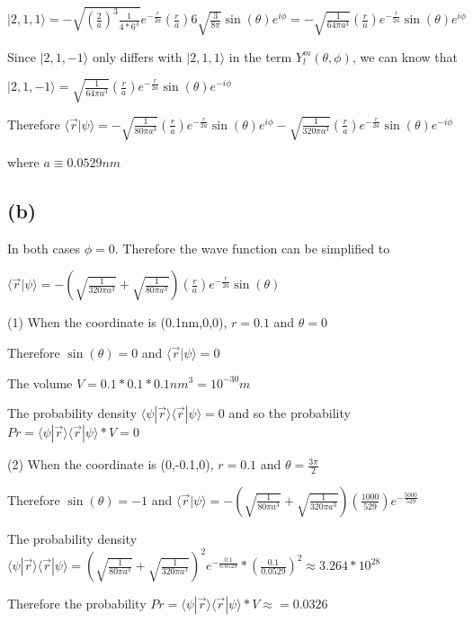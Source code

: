 \documentclass[12pt]{article}
\begin{document}
\begin{spacing}{2.0}
$|2,1,1\rangle=-\sqrt{\left(\frac{2}{a}\right)^{3}\frac{1}{4*6^3}}e^{-\frac{r}{2a}}\left(\frac{r}{a}\right)
6\sqrt{\frac{3}{8\pi}}\sin(\theta)e^{i\phi}
=-\sqrt{\frac{1}{64\pi a^3}}\left(\frac{r}{a}\right)e^{-\frac{r}{2a}}\sin(\theta)e^{i\phi}$

Since $|2,1,-1\rangle$ only differs with $|2,1,1\rangle$ in the term $Y_l^m(\theta,\phi)$, we can know that

$|2,1,-1\rangle=\sqrt{\frac{1}{64\pi a^3}}\left(\frac{r}{a}\right)e^{-\frac{r}{2a}}\sin(\theta)e^{-i\phi}$

Therefore $\langle\vec{r}|\psi\rangle= -\sqrt{\frac{1}{80\pi a^3}}\left(\frac{r}{a}\right)e^{-\frac{r}{2a}}\sin(\theta)e^{i\phi} -\sqrt{\frac{1}{320\pi a^3}}\left(\frac{r}{a}\right)e^{-\frac{r}{2a}}\sin(\theta)e^{-i\phi}$

where $a\equiv 0.0529 nm$

\subsection*{(b)}
In both cases $\phi=0$. Therefore the wave function can be simplified to

$\langle\vec{r}|\psi\rangle= -\left(\sqrt{\frac{1}{320\pi a^3}}+\sqrt{\frac{1}{80\pi a^3}}\right) \left(\frac{r}{a}\right)e^{-\frac{r}{2a}}\sin(\theta) $

(1) When the coordinate is (0.1nm,0,0), $r=0.1$ and $\theta=0$

Therefore $\sin(\theta)=0$ and $\langle\vec{r}|\psi\rangle=0$

The volume $V=0.1*0.1*0.1 nm^3=10^{-30}m$

The probability density $\langle\psi|\vec{r}\rangle \langle\vec{r}|\psi\rangle=0$ and so the probability $Pr=\langle\psi|\vec{r}\rangle \langle\vec{r}|\psi\rangle*V=0$

(2) When the coordinate is (0,-0.1,0), $r=0.1$ and $\theta=\frac{3\pi}{2}$

Therefore $\sin(\theta)=-1$ and $\langle\vec{r}|\psi\rangle= -\left(\sqrt{\frac{1}{80\pi a^3}} +\sqrt{\frac{1}{320\pi a^3}} \right) \left(\frac{1000}{529}\right)e^{-\frac{5000}{529}}$

The probability density $\langle\psi|\vec{r}\rangle \langle\vec{r}|\psi\rangle= \left(\sqrt{\frac{1}{80\pi a^3}} +\sqrt{\frac{1}{320\pi a^3}} \right)^2 e^{-\frac{0.1}{0.0529}}*(\frac{0.1}{0.0529})^2 \approx 3.264*10^{28}$

Therefore the probability $Pr=\langle\psi|\vec{r}\rangle \langle\vec{r}|\psi\rangle*V \approx = 0.0326$


\end{spacing}
\end{document}

